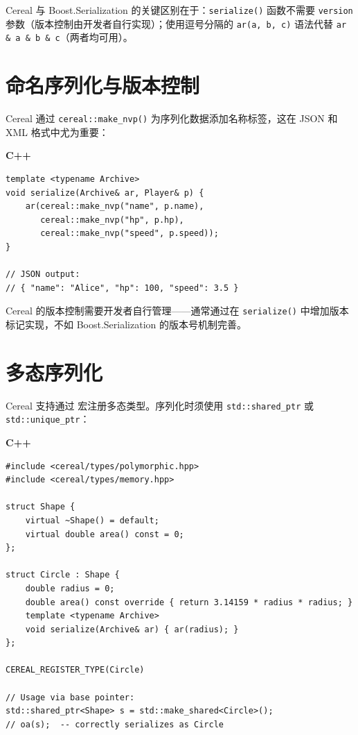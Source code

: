 \documentclass[12pt,a4paper,fontset=fandol]{ctexbook}
\newcommand{\Fn}[1]{\texttt{#1()}}
\newcommand{\Tp}[1]{\texttt{#1}}
\newcommand{\cpplabel}{%
  \noindent\begin{tcolorbox}[colback=algheadbg,coltext=white,
    sharp corners,boxrule=0pt,width=3.0em,height=1.4em,
    halign=center,valign=center,nobeforeafter,left=0pt,right=0pt,
    top=0pt,bottom=0pt]\small\bfseries C++\end{tcolorbox}}
\begin{document}
Cereal 与 Boost.Serialization 的关键区别在于：\Fn{serialize} 函数不需要 \Tp{version} 参数（版本控制由开发者自行实现）；使用逗号分隔的 \texttt{ar(a, b, c)} 语法代替 \texttt{ar \& a \& b \& c}（两者均可用）。

\section{命名序列化与版本控制}\label{sec:cereal-nvp}

Cereal 通过 \Fn{cereal::make\_nvp} 为序列化数据添加名称标签，这在 JSON 和 XML 格式中尤为重要：

\cpplabel
\begin{lstlisting}[caption={Cereal: 命名序列化 (JSON 输出)}]
template <typename Archive>
void serialize(Archive& ar, Player& p) {
    ar(cereal::make_nvp("name", p.name),
       cereal::make_nvp("hp", p.hp),
       cereal::make_nvp("speed", p.speed));
}

// JSON output:
// { "name": "Alice", "hp": 100, "speed": 3.5 }
\end{lstlisting}

Cereal 的版本控制需要开发者自行管理——通常通过在 \Fn{serialize} 中增加版本标记实现，不如 Boost.Serialization 的版本号机制完善。

\section{多态序列化}\label{sec:cereal-poly}

Cereal 支持通过  宏注册多态类型。序列化时须使用 \Tp{std::shared\_ptr} 或 \Tp{std::unique\_ptr}：

\cpplabel
\begin{lstlisting}[caption={Cereal: 多态类型序列化}]
#include <cereal/types/polymorphic.hpp>
#include <cereal/types/memory.hpp>

struct Shape {
    virtual ~Shape() = default;
    virtual double area() const = 0;
};

struct Circle : Shape {
    double radius = 0;
    double area() const override { return 3.14159 * radius * radius; }
    template <typename Archive>
    void serialize(Archive& ar) { ar(radius); }
};

CEREAL_REGISTER_TYPE(Circle)

// Usage via base pointer:
std::shared_ptr<Shape> s = std::make_shared<Circle>();
// oa(s);  -- correctly serializes as Circle
\end{lstlisting}
\end{document}
